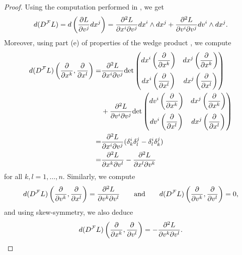 \begin{proof}
	Using the computation performed in \cite[363]{lee:smooth_manifolds:2013}, we get
	\begin{equation*}
		d(D^\mathcal{F}L) = d\del[3]{\frac{\partial L}{\partial v^j}dx^j} = \frac{\partial^2 L}{\partial x^i\partial v^j}dx^i \wedge dx^j + \frac{\partial^2L}{\partial v^i\partial v^j}dv^i \wedge dx^j.
	\end{equation*}
	Moreover, using part (e) of properties of the wedge product \cite[356]{lee:smooth_manifolds:2013}, we compute
	\begin{align*}
		d(D^\mathcal{F}L)\del[3]{\frac{\partial}{\partial x^k},\frac{\partial}{\partial x^l}} =& \frac{\partial^2 L}{\partial x^i\partial v^j}\det\begin{pmatrix}
			\displaystyle dx^i\del[3]{\frac{\partial}{\partial x^k}} & \displaystyle dx^j\del[3]{\frac{\partial}{\partial x^k}}\\[4mm]
			\displaystyle dx^i\del[3]{\frac{\partial}{\partial x^l}} & \displaystyle dx^j\del[3]{\frac{\partial}{\partial x^l}}
		\end{pmatrix}\\ 
		&+ \frac{\partial^2L}{\partial v^i\partial v^j}\det\begin{pmatrix}
			\displaystyle dv^i\del[3]{\frac{\partial}{\partial x^k}} & \displaystyle dx^j\del[3]{\frac{\partial}{\partial x^k}}\\[4mm]
			\displaystyle dv^i\del[3]{\frac{\partial}{\partial x^l}} & \displaystyle dx^j\del[3]{\frac{\partial}{\partial x^l}}
		\end{pmatrix}\\
		=& \frac{\partial^2 L}{\partial x^i\partial v^j}(\delta^i_k\delta^j_l - \delta^i_l\delta^j_k)\\
		=& \frac{\partial^2 L}{\partial x^k\partial v^l} - \frac{\partial^2 L}{\partial x^l\partial v^k}
	\end{align*}
	\noindent for all $k,l = 1,\dots,n$. Similarly, we compute
	\begin{equation*}
		d(D^\mathcal{F}L)\del[3]{\frac{\partial}{\partial v^k},\frac{\partial}{\partial x^l}} = \frac{\partial^2 L}{\partial v^k\partial v^l} \qquad \text{and} \qquad d(D^\mathcal{F}L)\del[3]{\frac{\partial}{\partial v^k},\frac{\partial}{\partial v^l}} = 0,
	\end{equation*}
	\noindent and using skew-symmetry, we also deduce
	\begin{equation*}
		d(D^\mathcal{F}L)\del[3]{\frac{\partial}{\partial x^k},\frac{\partial}{\partial v^l}} = -\frac{\partial^2 L}{\partial v^k\partial v^l}.

\end{equation*}
\end{proof}
